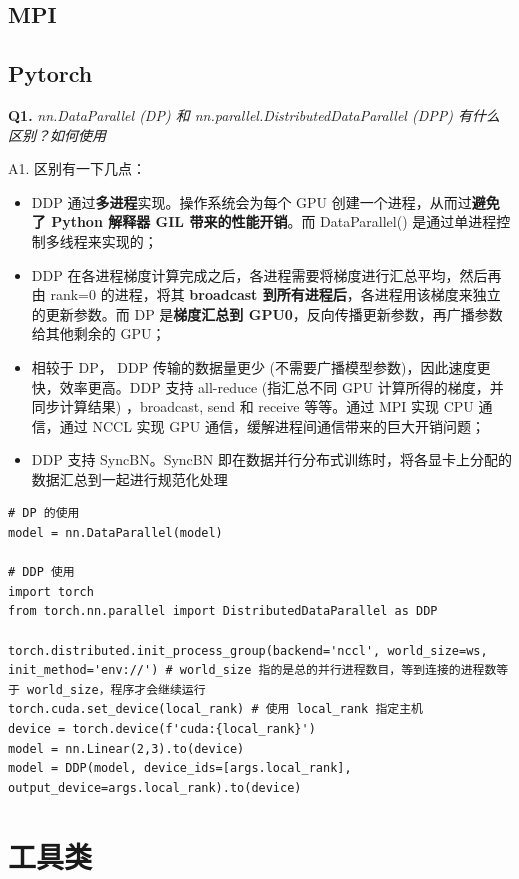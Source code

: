\documentclass[cn,10pt,math=newtx,citestyle=gb7714-2015,bibstyle=gb7714-2015]{elegantbook}
\begin{document}
\subsection{MPI}



\subsection{Pytorch}
\textbf{Q1.} \textit{nn.DataParallel (DP) 和 nn.parallel.DistributedDataParallel (DPP) 有什么区别？如何使用}

A1. 区别有一下几点：
\begin{itemize}
  \item DDP 通过\textbf{多进程}实现。操作系统会为每个 GPU 创建一个进程，从而过\textbf{避免了 Python 解释器 GIL 带来的性能开销}。而 DataParallel() 是通过单进程控制多线程来实现的；
  \item DDP 在各进程梯度计算完成之后，各进程需要将梯度进行汇总平均，然后再由 rank=0 的进程，将其 \textbf{broadcast 到所有进程后}，各进程用该梯度来独立的更新参数。而 DP 是\textbf{梯度汇总到 GPU0}，反向传播更新参数，再广播参数给其他剩余的 GPU；
  \item 相较于 DP， DDP 传输的数据量更少 (不需要广播模型参数)，因此速度更快，效率更高。DDP 支持 all-reduce (指汇总不同 GPU 计算所得的梯度，并同步计算结果) ，broadcast, send 和 receive 等等。通过 MPI 实现 CPU 通信，通过 NCCL 实现 GPU 通信，缓解进程间通信带来的巨大开销问题；
  \item DDP 支持 SyncBN。SyncBN 即在数据并行分布式训练时，将各显卡上分配的数据汇总到一起进行规范化处理
\end{itemize}

\begin{lstlisting}
# DP 的使用
model = nn.DataParallel(model)

# DDP 使用
import torch
from torch.nn.parallel import DistributedDataParallel as DDP

torch.distributed.init_process_group(backend='nccl', world_size=ws, init_method='env://') # world_size 指的是总的并行进程数目，等到连接的进程数等于 world_size，程序才会继续运行
torch.cuda.set_device(local_rank) # 使用 local_rank 指定主机
device = torch.device(f'cuda:{local_rank}')
model = nn.Linear(2,3).to(device)
model = DDP(model, device_ids=[args.local_rank], output_device=args.local_rank).to(device)
\end{lstlisting}

\newpage


\section{工具类}
\end{document}
